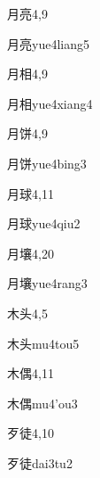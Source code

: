 \begin{entry}{月亮}{4,9}
  \begin{phonetics}{月亮}{yue4liang5}
  \end{phonetics}
\end{entry}

\begin{entry}{月相}{4,9}
  \begin{phonetics}{月相}{yue4xiang4}
  \end{phonetics}
\end{entry}

\begin{entry}{月饼}{4,9}
  \begin{phonetics}{月饼}{yue4bing3}
  \end{phonetics}
\end{entry}

\begin{entry}{月球}{4,11}
  \begin{phonetics}{月球}{yue4qiu2}
  \end{phonetics}
\end{entry}

\begin{entry}{月壤}{4,20}
  \begin{phonetics}{月壤}{yue4rang3}
  \end{phonetics}
\end{entry}

\begin{entry}{木头}{4,5}
  \begin{phonetics}{木头}{mu4tou5}
  \end{phonetics}
\end{entry}

\begin{entry}{木偶}{4,11}
  \begin{phonetics}{木偶}{mu4'ou3}
  \end{phonetics}
\end{entry}

\begin{entry}{歹徒}{4,10}
  \begin{phonetics}{歹徒}{dai3tu2}
  \end{phonetics}
\end{entry}

